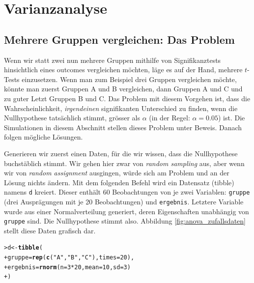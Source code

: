 \documentclass[oneside, 10pt]{book}\usepackage[]{graphicx}\usepackage[]{xcolor}
\makeatletter
\newcommand{\hlnum}[1]{\textcolor[rgb]{0.686,0.059,0.569}{#1}}%
\newcommand{\hlstr}[1]{\textcolor[rgb]{0.192,0.494,0.8}{#1}}%
\newcommand{\hlopt}[1]{\textcolor[rgb]{0,0,0}{#1}}%
\newcommand{\hlstd}[1]{\textcolor[rgb]{0.345,0.345,0.345}{#1}}%
\newcommand{\hlkwb}[1]{\textcolor[rgb]{0.69,0.353,0.396}{#1}}%
\newcommand{\hlkwc}[1]{\textcolor[rgb]{0.333,0.667,0.333}{#1}}%
\newcommand{\hlkwd}[1]{\textcolor[rgb]{0.737,0.353,0.396}{\textbf{#1}}}%
\newenvironment{kframe}{%
 \def\at@end@of@kframe{}%
 \ifinner\ifhmode%
  \def\at@end@of@kframe{\end{minipage}}%
  \begin{minipage}{\columnwidth}%
 \fi\fi%
 \def\FrameCommand##1{\hskip\@totalleftmargin \hskip-\fboxsep
 \colorbox{shadecolor}{##1}\hskip-\fboxsep
     \hskip-\linewidth \hskip-\@totalleftmargin \hskip\columnwidth}%
 \MakeFramed {\advance\hsize-\width
   \@totalleftmargin\z@ \linewidth\hsize
   \@setminipage}}%
 {\par\unskip\endMakeFramed%
 \at@end@of@kframe}
\newenvironment{knitrout}{}{} %
\makeatother
\begin{document}
\chapter{Varianzanalyse}\label{ch:anova}

\section{Mehrere Gruppen vergleichen: Das Problem}
Wenn wir statt zwei nun mehrere Gruppen
mithilfe von Signifikanztests
hinsichtlich eines outcomes vergleichen möchten,
läge es auf der Hand, mehrere $t$-Tests einzusetzen.
Wenn man zum Beispiel drei Gruppen vergleichen
möchte, könnte man zuerst Gruppen A und B vergleichen,
dann Gruppen A und C und zu guter Letzt Gruppen B und C.
Das Problem mit diesem Vorgehen ist, dass
die Wahrscheinlichkeit, \emph{irgendeinen}
signifikanten Unterschied zu finden, wenn die
Nullhypothese tatsächlich stimmt, grösser als $\alpha$
(in der Regel: $\alpha = 0.05$) ist.
Die Simulationen in diesem Abschnitt stellen
dieses Problem unter Beweis. Danach folgen mögliche
Lösungen.



Generieren wir zuerst einen Daten,
für die wir wissen, dass die Nullhypothese buchstäblich
stimmt. Wir gehen hier zwar von \textit{random sampling} aus,
aber wenn wir von \textit{random assignment} ausgingen,
würde sich am Problem und an der Lösung nichts ändern.
Mit dem folgenden Befehl wird ein Datensatz (tibble)
namens \texttt{d} kreiert. Dieser enthält
60 Beobachtungen von je zwei Variablen: \texttt{gruppe}
(drei Ausprägungen mit je 20 Beobachtungen)
und \texttt{ergebnis}. Letztere Variable wurde
aus einer Normalverteilung generiert, deren Eigenschaften
unabhängig von \texttt{gruppe} sind. Die Nullhypothese
stimmt also. Abbildung \ref{fig:anova_zufallsdaten}
stellt diese Daten grafisch dar.
\begin{knitrout}
\color{fgcolor}\begin{kframe}
\begin{alltt}
\hlstd{> }\hlstd{d} \hlkwb{<-} \hlkwd{tibble}\hlstd{(}
\hlstd{+ }  \hlkwc{gruppe} \hlstd{=} \hlkwd{rep}\hlstd{(}\hlkwd{c}\hlstd{(}\hlstr{"A"}\hlstd{,} \hlstr{"B"}\hlstd{,} \hlstr{"C"}\hlstd{),} \hlkwc{times} \hlstd{=} \hlnum{20}\hlstd{),}
\hlstd{+ }  \hlkwc{ergebnis} \hlstd{=} \hlkwd{rnorm}\hlstd{(}\hlkwc{n} \hlstd{=} \hlnum{3}\hlopt{*}\hlnum{20}\hlstd{,} \hlkwc{mean} \hlstd{=} \hlnum{10}\hlstd{,} \hlkwc{sd} \hlstd{=} \hlnum{3}\hlstd{)}
\hlstd{+ }\hlstd{)}
\end{alltt}
\end{kframe}
\end{knitrout}
\end{document}

